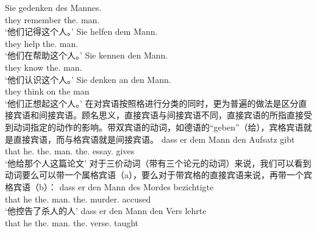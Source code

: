 \eal
\ex 
\gll Sie gedenken des Mannes.\\
	 they remember the.\gen{} man.\gen{}\\
\glt `他们记得这个人。'
\ex 
\gll Sie helfen dem Mann.\\
	 they help the.\dat{} man.\dat{}\\
\glt `他们在帮助这个人。'
\ex 
\gll Sie kennen den Mann.\\
	 they know the.\acc{} man.\acc{}\\
\glt `他们认识这个人。'
\ex 
\gll Sie denken an den Mann.\\
	 they think on the man\\
\glt `他们正想起这个人。'
\zl
在对宾语按照格进行分类的同时，更为普遍的做法是区分直接宾语和间接宾语。顾名思义，直接宾语与间接宾语不同，直接宾语的所指直接受到动词指定的动作的影响。带双宾语的动词，如德语的“geben”（给），宾格宾语就是直接宾语，而与格宾语就是间接宾语。
\ea
\gll dass er dem Mann den Aufsatz gibt\\
	 that he.\nom{} the.\dat{} man.\dat{} the.\acc{} essay.\acc{} gives\\
\glt `他给那个人这篇论文'
\z
对于三价动词（带有三个论元的动词）来说，我们可以看到动词要么可以带一个属格宾语（a），要么对于带宾格的直接宾语来说，再带一个宾格宾语（b）：
\eal
\ex 
\gll dass er den Mann des Mordes bezichtigte\\
	 that he the.\acc{} man.\acc{} the.\gen{} murder.\gen{} accused\\
\glt `他控告了杀人的人'
\ex 
\gll dass er den Mann den Vers lehrte\\
	 that he the.\acc{} man.\acc{} the.\acc{} verse.\acc{} taught\\
